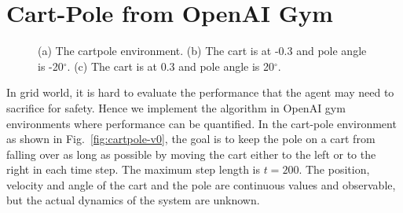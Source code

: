{\section{Cart-Pole from OpenAI Gym}
\begin{figure}[hbt]
  \centering
  \caption[The cartpole environment]{(a) The cartpole environment. (b) The cart is at -0.3 and pole angle is {-20}$^\circ$. (c) The cart is at 0.3 and pole angle is {20}$^\circ$.}    
\label{fig:cartpole}
\end{figure}
In grid world, it is hard to evaluate the performance that the agent may need to sacrifice for safety. Hence we implement the algorithm in OpenAI gym environments where performance can be quantified. In the cart-pole environment as shown in Fig.~\ref{fig:cartpole-v0}, the goal is to keep the pole on a cart from falling over as long as possible by moving the cart either to the left or to the right in each time step. The maximum step length is $t=200$. The position, velocity and angle of the cart and the pole are continuous values and observable, but the actual dynamics of the system are unknown.

}
